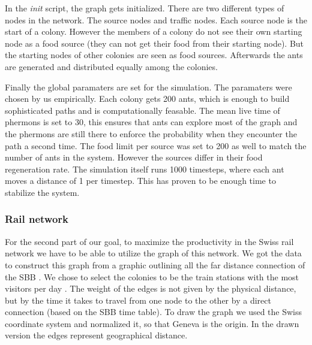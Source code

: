 In the \textit{init} script, the graph gets initialized. There are two different types of nodes in the network. The source nodes and traffic nodes.
Each source node is the start of a colony. However the members of a colony do not see their own starting node as a food source (they can not get their food from their starting node). But the starting nodes of other colonies are seen as food sources. Afterwards the ants are generated and distributed equally among the colonies. 

Finally the global paramaters are set for the simulation. The paramaters were chosen by us empirically. Each colony gets 200 ants, which is enough to build sophisticated paths and is computationally feasable. The mean live time of phermons is set to 30, this ensures that ants can explore most of the graph and the phermons are still there to enforce the probability when they encounter the path a second time. The food limit per source was set to 200 as well to match the number of ants in the system. However the sources differ in their food regeneration rate. The simulation itself runs 1000 timesteps, where each ant moves a distance of 1 per timestep. This has proven to be enough time to stabilize the system.

\subsubsection{Rail network}
For the second part of our goal, to maximize the productivity in the Swiss rail network we have to be able to utilize the graph of this network. We got the data to construct this graph from a graphic outlining all the far distance connection of the SBB \citep{SbbStats2}. We chose to select the colonies to be the train stations with the most visitors per day \citep{SbbStats1}. The weight of the edges is not given by the physical distance, but by the time it takes to travel from one node to the other by a direct connection (based on the SBB time table)\citep{SbbStats3}. To draw the graph we used the Swiss coordinate system and normalized it, so that Geneva is the origin. In the drawn version the edges represent geographical distance.


